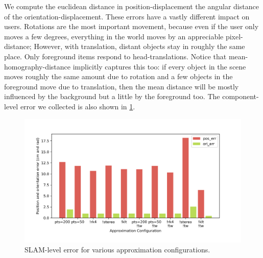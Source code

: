 We compute the euclidean distance in position-displacement the angular distance of the orientation-displacement.
These errors have a vastly different impact on users.
Rotations are the most important movement, because even if the user only moves a few degrees, everything in the world moves by an appreciable pixel-distance;
However, with translation, distant objects stay in roughly the same place. Only foreground items respond to head-translations.
Notice that mean-homography-distance implicitly captures this too:
if every object in the scene moves roughly the same amount due to rotation and a few objects in the foreground move due to translation, then the mean distance will be mostly influenced by the background but a little by the foreground too.
The component-level error we collected is also shown in \cref{SLAM-level-errors}.

\begin{figure}
  \label{SLAM-level-errors}
  \caption{SLAM-level error for various approximation configurations.}
  \includegraphics[width=\columnwidth]{slam_errors.png}
\end{figure}
